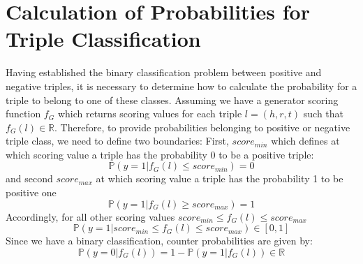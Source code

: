 \section{Calculation of Probabilities for Triple Classification} \label{sec:calculation_of_probabilities_for_triple_classification}
%
Having established the binary classification problem between positive and negative triples, it is necessary to determine how to calculate the probability for a triple to belong to one of these classes.
Assuming we have a generator scoring function $f_G$ which returns scoring values for each triple $l = (h,r,t)$ such that $f_G(l) \in \mathbb{R}$.
Therefore, to provide probabilities belonging to positive or negative triple class, we need to define two boundaries:
First, $score_{min}$ which defines at which scoring value a triple has the probability 0 to be a positive triple: 
\begin{equation} \label{eqn:prob_score_min}
    \mathds{P}(y = 1 | f_G(l) \leq score_{min}) = 0
\end{equation}
and second $score_{max}$ at which scoring value a triple has the probability 1 to be positive one 
\begin{equation} \label{eqn:prob_score_max}
    \mathds{P}(y = 1 | f_G(l) \geq score_{max}) = 1
\end{equation}
Accordingly, for all other scoring values $score_{min} \leq f_G(l) \leq score_{max}$
\begin{equation} \label{eqn:prob_score_all}
    \mathds{P}(y = 1 | score_{min} \leq f_G(l) \leq score_{max}) \in [0, 1]
\end{equation}
Since we have a binary classification, counter probabilities are given by:
\begin{equation} \label{eqn:counter_prob}
    \mathds{P}(y = 0 | f_G(l)) = 1 - \mathds{P}(y = 1 | f_G(l)) \in \mathbb{R}
\end{equation}

